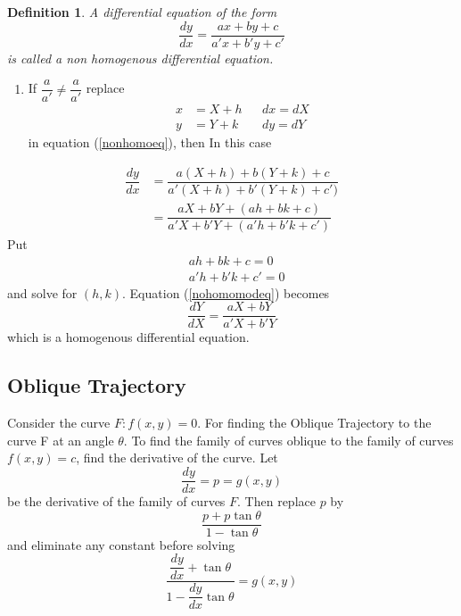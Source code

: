 \documentclass[a4paper, titlepage]{article}
\newtheorem{definition}{Definition}[section]
\begin{document}
    \begin{definition}
        A differential equation of the form
        \begin{equation}
            \label{nonhomoeq}
            \dfrac{dy}{dx} = \dfrac{ax + by + c}{a'x + b'y + c'}
        \end{equation}
        is called a non homogenous differential equation.
    \end{definition}
    \begin{enumerate}[label=\arabic*]
        \item If $\dfrac{a}{a'} \neq \dfrac{a}{a'}$ replace
        \begin{align*}
            x &= X + h && dx = dX \\
            y &= Y + k && dy = dY
        \end{align*}
        in equation (\ref{nonhomoeq}), then
        In this case 
    \end{enumerate}
    \begin{align}
        \dfrac{dy}{dx} &= \dfrac{a(X+h) + b(Y+k) + c}{a'(X+h) + b'(Y+k) + c')} \nonumber\\
        \label{nohomomodeq}
                       &= \dfrac{aX + bY + (ah + bk + c)}{a'X + b'Y + (a'h + b'k + c')}
    \end{align}
    Put
    \begin{align*}
        &{} ah + bk + c = 0 \\
        &{} a'h + b'k + c' = 0
    \end{align*}
    and solve for $(h, k)$. Equation (\ref{nohomomodeq}) becomes
    \[ \dfrac{dY}{dX} = \dfrac{aX + bY}{a'X + b'Y} \]
    which is a homogenous differential equation. 
\subsection{Oblique Trajectory}
Consider the curve $F: f(x, y) = 0$. For finding the Oblique Trajectory
to the curve F at an angle $\theta$. To find the family of curves
oblique to the family of curves $f(x, y) = c$, find the derivative of
the curve. Let $$\dfrac{dy}{dx} = p = g(x, y)$$ be the derivative of the family
of curves $F$. Then replace $p$ by \[ \dfrac{p + p\tan\theta}{1-\tan\theta} \]
and eliminate any constant before solving
\[ \dfrac{\dfrac{dy}{dx} + \tan\theta}{1 - \dfrac{dy}{dx}\tan\theta} = g(x,y) \]
\end{document}
